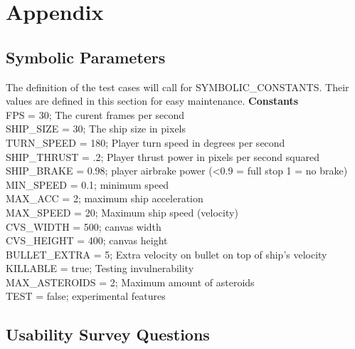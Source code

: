 \documentclass[12pt, titlepage]{article}
\begin{document}
\newpage

\section{Appendix}


\subsection{Symbolic Parameters}

The definition of the test cases will call for SYMBOLIC\_CONSTANTS.
Their values are defined in this section for easy maintenance.
\textbf{Constants}\\
FPS = 30; The curent frames per second\\
SHIP\_SIZE = 30; The ship size in pixels\\
TURN\_SPEED = 180; Player turn speed in degrees per second\\
SHIP\_THRUST = .2; Player thrust power in pixels per second squared \\
SHIP\_BRAKE = 0.98; player airbrake power (<0.9 = full stop 1 = no brake) \\
MIN\_SPEED = 0.1; minimum speed \\
MAX\_ACC = 2; maximum ship acceleration \\
MAX\_SPEED = 20; Maximum ship speed (velocity) \\
CVS\_WIDTH = 500; canvas width \\
CVS\_HEIGHT = 400; canvas height \\
BULLET\_EXTRA = 5; Extra velocity on bullet on top of ship's velocity \\
KILLABLE = true; Testing invulnerability \\
MAX\_ASTEROIDS = 2; Maximum amount of asteroids \\
TEST = false; experimental features \\


\subsection{Usability Survey Questions}
\label{interview:questions}
\end{document}
